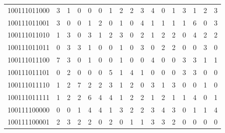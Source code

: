 \documentclass[10pt,a4paper]{article}
\begin{document}
\begin{longtable}{ |c|c|c|c|c|c|c|c|c|c|c|c|c|c|c|c|c| }
    100111011000              & 3                            & 1                                & 0                            & 0                              & 0   & 1   & 2   & 2   & 3   & 4   & 0   & 1   & 3   & 1   & 2   & 3   \\
    100111011001              & 3                            & 0                                & 0                            & 1                              & 2   & 0   & 1   & 0   & 4   & 1   & 1   & 1   & 1   & 6   & 0   & 3   \\
    100111011010              & 1                            & 3                                & 0                            & 3                              & 1   & 2   & 3   & 0   & 2   & 1   & 2   & 2   & 0   & 4   & 2   & 2   \\
    100111011011              & 0                            & 3                                & 3                            & 1                              & 0   & 0   & 1   & 0   & 3   & 0   & 2   & 2   & 0   & 0   & 3   & 0   \\
    100111011100              & 7                            & 3                                & 0                            & 1                              & 0   & 0   & 1   & 0   & 0   & 4   & 0   & 0   & 3   & 3   & 1   & 1   \\
    100111011101              & 0                            & 2                                & 0                            & 0                              & 0   & 5   & 1   & 4   & 1   & 0   & 0   & 0   & 3   & 3   & 0   & 0   \\
    100111011110              & 1                            & 2                                & 7                            & 2                              & 2   & 3   & 1   & 2   & 0   & 3   & 1   & 3   & 0   & 0   & 1   & 0   \\
    100111011111              & 1                            & 2                                & 2                            & 6                              & 4   & 4   & 1   & 2   & 2   & 1   & 2   & 1   & 1   & 4   & 0   & 1   \\
    100111100000              & 0                            & 0                                & 1                            & 4                              & 4   & 1   & 3   & 2   & 2   & 3   & 4   & 3   & 0   & 1   & 1   & 4   \\
    100111100001              & 2                            & 3                                & 2                            & 2                              & 0   & 2   & 0   & 1   & 1   & 3   & 3   & 2   & 0   & 0   & 0   & 0   \\

\end{longtable}
\end{document}
